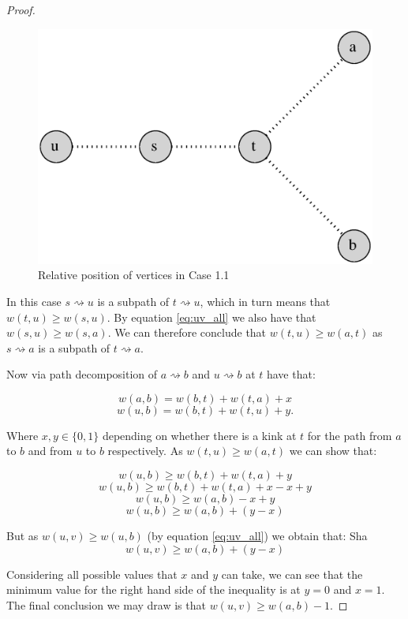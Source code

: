 \begin{proof}
\begin{figure}%
    \centering
    \includegraphics[center, scale=0.5 ]{./images/2xbfs-case-1-1.eps}
    \caption{Relative position of vertices in Case 1.1 }%
    \label{fig:case1.1}%
\end{figure}

In this case $s \rightsquigarrow u$ is a subpath of $t \rightsquigarrow u$, which in turn means that $w(t, u) \ge w(s, u)$. By equation \ref{eq:uv_all} we also have that $w(s, u) \ge w(s, a)$. We can therefore conclude that $w(t, u) \ge w(a, t)$ as $s \rightsquigarrow a$ is a subpath of $t \rightsquigarrow a$.

Now via path decomposition of $a \rightsquigarrow b$ and $u \rightsquigarrow b$ at $t$ have that:

$$ w(a, b) = w(b, t) + w(t, a) + x  $$
$$ w(u, b) = w(b, t) + w(t, u) + y .$$

Where $x, y \in \{0, 1\}$ depending on whether there is a kink at $t$ for the path from $a$ to $b$ and from $u$ to $b$ respectively. As $w(t, u) \ge w(a, t)$ we can show that:


$$ w(u, b) \ge w(b, t) + w(t, a) + y $$
$$ w(u, b) \ge w(b, t) + w(t, a) + x - x + y $$
$$ w(u, b) \ge w(a, b) - x + y $$
$$ w(u, b) \ge w(a, b) + (y - x) $$

But as $w(u, v) \ge w(u, b)$ (by equation \ref{eq:uv_all}) we obtain that: Sha
$$ w(u, v) \ge w(a, b) + (y - x) $$

Considering all possible values that $x$ and $y$ can take, we can see that the minimum value for the right hand side of the inequality is at $y = 0$ and $x = 1$. The final conclusion we may draw is that $w(u, v) \ge w(a, b) -1$.




\end{proof}

